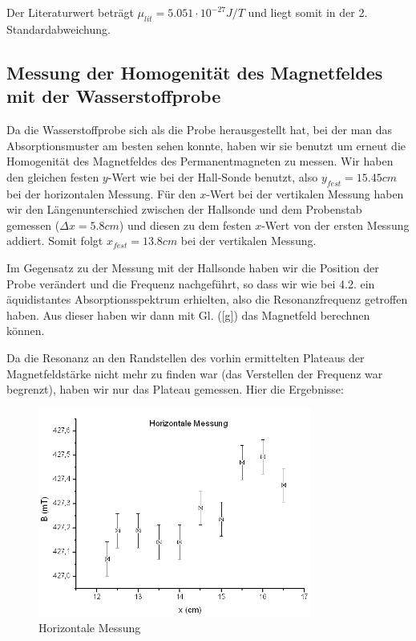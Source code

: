 Der Literaturwert beträgt $\mu_{lit} = 5.051 \cdot 10^{-27} J/T$ und liegt somit in der 2. Standardabweichung.

\subsection{Messung der Homogenität des Magnetfeldes mit der Wasserstoffprobe}

Da die Wasserstoffprobe sich als die Probe herausgestellt hat, bei der man das Absorptionsmuster am besten sehen konnte, haben wir sie benutzt um erneut die Homogenität des Magnetfeldes des Permanentmagneten zu messen. Wir haben den gleichen festen $y$-Wert wie bei der Hall-Sonde benutzt, also $y_{fest} = 15.45 cm$ bei der horizontalen Messung. Für den $x$-Wert bei der vertikalen Messung haben wir den Längenunterschied zwischen der Hallsonde und dem Probenstab gemessen ($\Delta x = 5.8 cm$) und diesen zu dem festen $x$-Wert von der ersten Messung addiert. Somit folgt $x_{fest} = 13.8 cm$ bei der vertikalen Messung.

Im Gegensatz zu der Messung mit der Hallsonde haben wir die Position der Probe verändert und die Frequenz nachgeführt, so dass wir wie bei 4.2. ein äquidistantes Absorptionsspektrum erhielten, also die Resonanzfrequenz getroffen haben. Aus dieser haben wir dann mit Gl. (\ref{g}) das Magnetfeld berechnen können. 

Da die Resonanz an den Randstellen des vorhin ermittelten Plateaus der Magnetfeldstärke nicht mehr zu finden war (das Verstellen der Frequenz war begrenzt), haben wir nur das Plateau gemessen. Hier die Ergebnisse:

\begin{figure}[H]
\centering \includegraphics[width=0.8\textwidth]{Bilder/homhor.png}
\caption{Horizontale Messung}
\end{figure}


